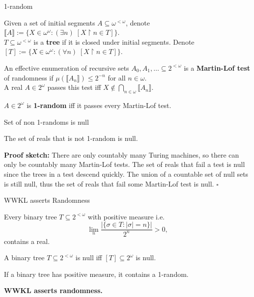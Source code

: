 \begin{frame}{1-random}
  \begin{notation*}
    Given a set of initial segments $A\subseteq\omega^{<\omega}$, denote
    $\llbracket A\rrbracket:= \{X\in\omega^\omega: (\exists n)\;
    [X\restriction n \in T]\}$.\\
    \vspace{0.5em}
    $T\subseteq\omega^{<\omega}$ is a \textbf{tree} if it is closed under
    initial segments. Denote $[T]:= \{X\in\omega^\omega: (\forall n)\;
    [X\restriction n \in T]\}$.
  \end{notation*}

  \begin{define*}
    An effective enumeration of recursive sets
    $A_0,A_1,\ldots \subseteq 2^{<\omega}$ is a \textbf{Martin-Lof test} of
    randomness if $\mu(\llbracket A_n\rrbracket) \leq 2^{-n}$ for all
    $n\in\omega$.\\
    \vspace{0.5em}
    A real $A\in2^\omega$ passes this test iff $X\not\in
    \bigcap_{n\in\omega} \llbracket A_n\rrbracket$.
  \end{define*}

  \begin{define*}
    $A\in2^\omega$ is \textbf{1-random} iff it passes every Martin-Lof
    test.
  \end{define*}
\end{frame}

\begin{frame}{Set of non 1-randoms is null}
  \begin{fact*}
    The set of reals that is not 1-random is null.
  \end{fact*}

  \vspace{2em}
  \textbf{Proof sketch:} There are only countably many Turing machines, so
  there can only be countably many Martin-Lof tests. The set of reals that
  fail a test is null since the trees in a test descend quickly. The union
  of a countable set of null sets is still null, thus the set of reals that
  fail some Martin-Lof test is null. $\square$
\end{frame}

\begin{frame}{WWKL asserts Randomness}
  \begin{thm*}
    Every binary tree $T\subseteq 2^{<\omega}$ with positive measure i.e.
    \[\lim_n \frac{|\{\sigma\in T: |\sigma|=n\}|}{2^n} >0,\]
    contains a real.
  \end{thm*}
  \begin{fact}
    A binary tree $T\subseteq2^{<\omega}$ is null iff
    $[T]\subseteq2^\omega$ is null.
  \end{fact}
  \begin{coro}
    If a binary tree has positive measure, it contains a 1-random.
  \end{coro}

  \textbf{WWKL asserts randomness.}
\end{frame}

